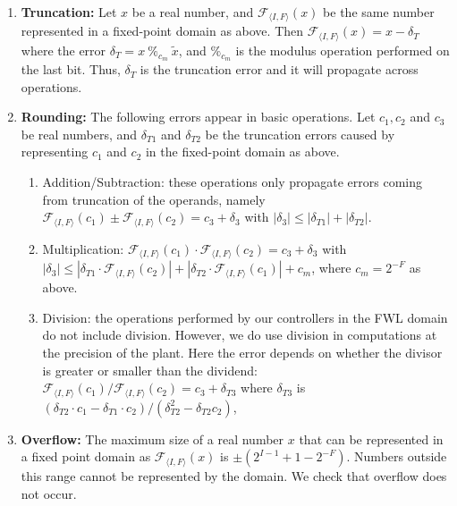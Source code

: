 \documentclass[twocolumn]{autart}    %
\begin{document}
\begin{enumerate}

\item {\bf Truncation:} Let $x$ be a real number, and $\mathcal{F}_{\langle
I,F \rangle}(x)$ be the same number represented in a fixed-point domain as
above.  Then $\mathcal{F}_{\langle I,F \rangle}(x) = x-\delta_T$ where the
error $ \delta_T=x\ \%_{c_m}\ \tilde x$, and $\%_{c_m}$ is the modulus
operation performed on the last bit. 
Thus, $\delta_T$ is the truncation error and it will propagate across
operations.
%
\item {\bf Rounding:} The following errors appear in basic operations.  Let
$c_1, c_2$ and $c_3$ be real numbers, and $\delta_{T1}$ and $\delta_{T2}$ be
the truncation errors caused by representing $c_1$ and $c_2$ in the
fixed-point domain as above.
%
\begin{enumerate}
%
\item Addition/Subtraction: these operations only propagate errors coming
from truncation of the operands, namely $\mathcal{F}_{\langle I,F
\rangle}(c_1) \pm \mathcal{F}_{\langle I,F \rangle}(c_2) = c_3 + \delta_3$
with $|\delta_3| \leq |\delta_{T1}| + |\delta_{T2}|$.
%
\item Multiplication: $\mathcal{F}_{\langle I,F \rangle}(c_1) \cdot
\mathcal{F}_{\langle I,F \rangle}(c_2) =  c_3 + \delta_3$ with $|\delta_3|
\leq |\delta_{T1}\cdot\mathcal{F}_{\langle I,F \rangle}(c_2)|\allowbreak +
|\delta_{T2}\cdot\mathcal{F}_{\langle I,F \rangle}(c_1)| + c_m$, where
$c_m=2^{-F}$ as above.
%
\item Division: the operations performed by our controllers in the FWL
domain do not include division.  However, we do use division in computations
at the precision of the plant.  Here the error depends on whether the
divisor is greater or smaller than the dividend:  $\mathcal{F}_{\langle I,F
\rangle}(c_1) / \mathcal{F}_{\langle I,F \rangle}(c_2) = c_3 + \delta_{T3}$
where $\delta_{T3}$ is $(\delta_{T2}\cdot c_1 - \delta_{T1}\cdot
c_2)/(\delta_{T2}^2 - \delta_{T2} c_2)$,
\end{enumerate}

\item {\bf Overflow:}
The maximum size of a real number $x$ that can be represented in a fixed
point domain as $\mathcal{F}_{\langle I,F \rangle}(x)$ is $\pm
(2^{I-1}+1-2^{-F})$.  Numbers outside this range cannot be represented by
the domain.  We check that overflow does not occur.

\end{enumerate}
\end{document}
